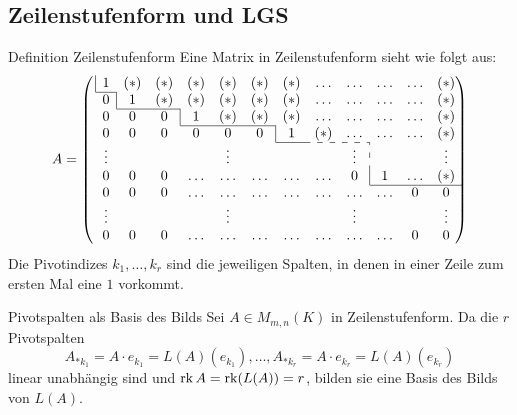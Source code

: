 \documentclass[main.tex]{subfiles}
\begin{document}
\subsection*{Zeilenstufenform und LGS}
\begin{karte}{Definition Zeilenstufenform}
    Eine Matrix in Zeilenstufenform sieht wie folgt aus:
    \begin{equation*}
        A =
        \left(\mkern3mu
          \begin{array}{*{12}c}
            \multicolumn{1}{|c}{1} & (*) & (*) & (*) & (*) & (*) & (*) & \ldots & \ldots & \ldots & \ldots & (*) \\
            \cline{1-1}
            0 & \multicolumn{1}{|c}{1} & (*) & (*) & (*) & (*) & (*)  & \ldots & \ldots & \ldots & \ldots &  (*) \\
            \cline{2-3}
            0 & 0 & 0 & \multicolumn{1}{|c}{1} & (*) & (*) & (*) & \ldots & \ldots & \ldots & \ldots &  (*)\\
            \cline{4-6}
            0 & 0 & 0 & 0 & 0 & 0 & \multicolumn{1}{|c}{1} & (*) & \ldots & \ldots & \ldots &  (*) \\
            \cline{7-7}\cdashline{8-9}
            \vdots & & & & \vdots & & & & \vdots & \multicolumn{1}{:c}{} & & \vdots \\
            0 & 0 & 0 & \ldots & \ldots & \ldots & \ldots & \ldots & 0 & \multicolumn{1}{|c}{1} & \ldots & (*) \\
            \cline{10-12}
            0 & 0 & 0 & \ldots  & \ldots & \ldots & \ldots & \ldots & \ldots & \ldots & 0 &  0 \\
            \vdots & & & & \vdots & & & & \vdots & & & \vdots \\
            0 & 0 & 0 & \ldots  & \ldots & \ldots & \ldots & \ldots & \ldots & \ldots & 0 &  0
          \end{array}
         \hskip-\arraycolsep\right)
      \end{equation*}
      Die Pivotindizes \( k_1,\ldots, k_r \) sind die jeweiligen Spalten, 
      in denen in einer Zeile zum ersten Mal eine \( 1 \) vorkommt.
\end{karte}
\begin{karte}{Pivotspalten als Basis des Bilds}
    Sei \( A \in M_{m,n}(K) \) in Zeilenstufenform.
    Da die \(r\) Pivotspalten 
    \[ A_{*k_1} = A \cdot e_{k_1} = L(A)(e_{k_1}), \ldots, 
    A_{*k_r} = A \cdot e_{k_r} = L(A)(e_{k_r}) \]
    linear unabhängig sind und \( \operatorname{rk} A = \operatorname{rk}(L(A)) = r\), 
    bilden sie eine Basis des Bilds von \( L(A)\).
\end{karte}
\end{document}
